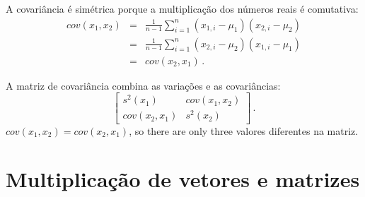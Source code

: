 A covariância é simétrica porque a multiplicação dos números reais é comutativa:
\begin{eqnarray*}
\textit{cov}(x_1,x_2) &=& \frac{1}{n-1}\sum^n_{i=1} (x_{1,i}-\mu_1)(x_{2,i}-\mu_2)\\
&=& \frac{1}{n-1}\sum^n_{i=1} (x_{2,i}-\mu_2)(x_{1,i}-\mu_1)\\
&=&\textit{cov}(x_2,x_1)\,.
\end{eqnarray*}

A matriz de covariância combina as variações e as covariâncias:
\[
\left[ \begin{array}{ll} s^2(x_1) & \textit{cov}(x_1,x_2)\\ \textit{cov}(x_2,x_1)& s^2(x_2)\end{array}\right]\,.
\]
$\textit{cov}(x_1,x_2)=\textit{cov}(x_2,x_1)$, so there are only three valores diferentes na matriz.

\section{Multiplicação de vetores e matrizes}\label{a.matrices}

